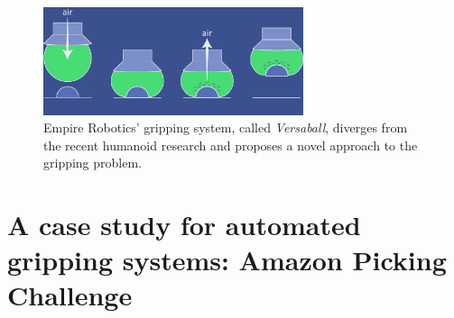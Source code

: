 \begin{figure}[htbp]
\centering
\includegraphics[width=3in]{./Graphics/versaball}
\caption{Empire Robotics' gripping system, called \emph{Versaball},
  diverges from the recent humanoid research and proposes a novel
  approach to the gripping problem.\label{fig:versaball}}
\end{figure}

\section{A case study for automated gripping systems: Amazon Picking
  Challenge}
